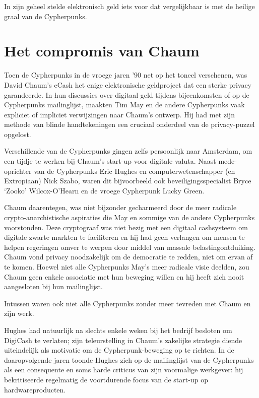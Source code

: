 \documentclass[
  a5paper,
  smalldemyvopaper,11pt,twoside,onecolumn,openright,extrafontsizes]{memoir}
\begin{document}
In zijn geheel stelde elektronisch geld iets voor dat vergelijkbaar is
met de heilige graal van de Cypherpunks.

\section{Het compromis van Chaum}\label{het-compromis-van-chaum}

Toen de Cypherpunks in de vroege jaren '90 net op het toneel verschenen,
was David Chaum's eCash het enige elektronische geldproject dat een
sterke privacy garandeerde. In hun discussies over digitaal geld tijdens
bijeenkomsten of op de Cypherpunks mailinglijst, maakten Tim May en de
andere Cypherpunks vaak expliciet of impliciet verwijzingen naar Chaum's
ontwerp. Hij had met zijn methode van blinde handtekeningen een cruciaal
onderdeel van de privacy-puzzel opgelost.

Verschillende van de Cypherpunks gingen zelfs persoonlijk naar
Amsterdam, om een tijdje te werken bij Chaum's start-up voor digitale
valuta. Naast mede-oprichter van de Cypherpunks Eric Hughes en
computerwetenschapper (en Extropiaan) Nick Szabo, waren dit bijvoorbeeld
ook beveiligingsspecialist Bryce `Zooko' Wilcox-O'Hearn en de vroege
Cypherpunk Lucky Green.

Chaum daarentegen, was niet bijzonder gecharmeerd door de meer radicale
crypto-anarchistische aspiraties die May en sommige van de andere
Cypherpunks voorstonden. Deze cryptograaf was niet bezig met een
digitaal cashsysteem om digitale zwarte markten te faciliteren en hij
had geen verlangen om mensen te helpen regeringen omver te werpen door
middel van massale belastingontduiking. Chaum vond privacy noodzakelijk
om de democratie te redden, niet om ervan af te komen. Hoewel niet alle
Cypherpunks May's meer radicale visie deelden, zou Chaum geen enkele
associatie met hun beweging willen en hij heeft zich nooit aangesloten
bij hun mailinglijst.

Intussen waren ook niet alle Cypherpunks zonder meer tevreden met Chaum
en zijn werk.

Hughes had natuurlijk na slechts enkele weken bij het bedrijf besloten
om DigiCash te verlaten; zijn teleurstelling in Chaum's zakelijke
strategie diende uiteindelijk als motivatie om de Cypherpunk-beweging op
te richten. In de daaropvolgende jaren toonde Hughes zich op de
mailinglijst van de Cypherpunks als een consequente en soms harde
criticus van zijn voormalige werkgever: hij bekritiseerde regelmatig de
voortdurende focus van de start-up op hardwareproducten.
\end{document}
